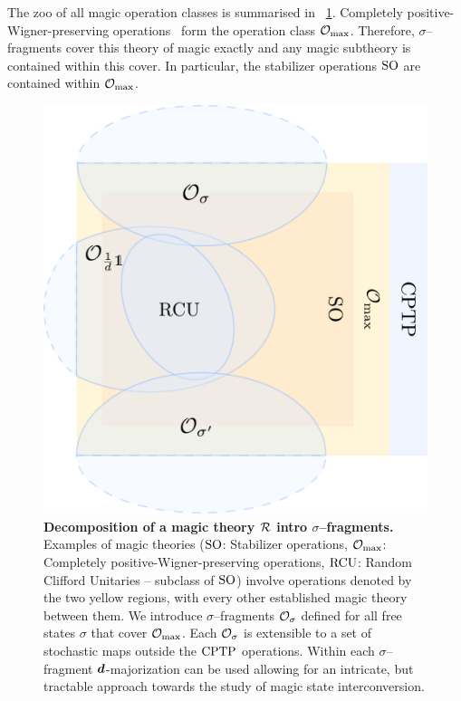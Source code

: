 \documentclass[pra,
aps,
twocolumn,
superscriptaddress,
groupedaddress,
nofootinbib,
reprint
]{revtex4-1}
\begin{document}
The zoo of all magic operation classes is summarised in ~\cref{fig:zoo}.
Completely positive-Wigner-preserving operations~\cite{cit:wang} form the operation class $\mathcal{O}_{\rm{}max}$.
Therefore, $\sigma$--fragments cover this theory of magic exactly and any magic subtheory is contained within this cover.
In particular, the stabilizer operations ${\rm{SO}}$ are contained within $\mathcal{O}_{\rm{}max}$.
\begin{figure}[t]
    \centering
        \includegraphics[scale=0.47
        ]{figs/operations.pdf}
    \caption{\textbf{Decomposition of a magic theory $\mathcal{R}$ intro $\sigma$--fragments.} 
	Examples of magic theories (${\rm{SO}}$: Stabilizer operations, $\mathcal{O}_{\rm{}max}$: Completely positive-Wigner-preserving operations, ${\rm{RCU}}$: Random Clifford Unitaries -- subclass of ${\rm{SO}}$) involve operations denoted by the two yellow regions, with every other established magic theory  between them.
    We introduce $\sigma$--fragments $\mathcal{O}_\sigma$ defined for all free states $\sigma$ that cover $\mathcal{O}_{\rm{}max}$. 
    Each $\mathcal{O}_\sigma$ is extensible to a set of stochastic maps outside the ${\rm{CPTP}}$ operations.
    Within each $\sigma$--fragment $\bm{d}$-majorization can be used allowing for an intricate, but tractable approach towards the study of magic state interconversion.
    }
    \label{fig:zoo}
\end{figure}
\end{document}
